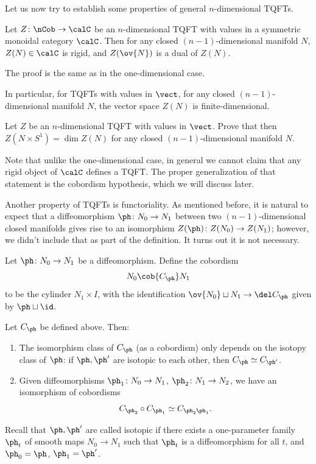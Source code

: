Let us now try to establish some properties of general $n$-dimensional TQFTs.

\begin{theorem}\label{t:tqft-rigidity}
  Let $Z\colon \nCob\to \calC$ be an $n$-dimensional TQFT with values in a
  symmetric monoidal category $\calC$. Then for any closed $(n-1)$-dimensional
  manifold $N$, $Z(N)\in \calC$ is rigid, and $Z(\ov{N})$ is a dual of $Z(N)$.
\end{theorem}
The proof is the same as in the one-dimensional case.

In particular, for TQFTs with values in $\vect$, for any closed
$(n-1)$-dimensional manifold $N$, the vector space $Z(N)$ is finite-dimensional.

\begin{exercise}\label{ec:tqft-duality}
  Let $Z$ be an $n$-dimensional TQFT with values in $\vect$. Prove that then
  $Z(N\times S^1)=\dim Z(N)$ for any closed $(n-1)$-dimensional manifold $N$.
\end{exercise}

Note that unlike the one-dimensional case, in general we cannot claim that any
rigid object of $\calC$ defines a TQFT. The proper generalization of that
statement is the cobordism hypothesis, which we will discuss later.



Another property of TQFTs is functoriality. As mentioned before, it is
natural to expect that a diffeomorphism $\ph \colon N_0\to N_1$ between two
$(n-1)$-dimensional closed manifolds gives rise to an isomorphism
$Z(\ph)\colon Z(N_0)\to Z(N_1)$; however, we didn't include that as part of
the definition. It turns out it is not necessary.

Let $\ph \colon N_0\to N_1$ be a diffeomorphism. Define the cobordism
\begin{equation}\label{e:Cph}
  N_0\cob{C_\ph} N_1
\end{equation}
to be the cylinder $N_1\times I$, with the identification $\ov{N_0}\sqcup N_1
\to \del C_\ph$ given by $\ph\sqcup \id$.

\begin{lemma}\label{l:tqft-isotopy}
  Let $C_\ph$ be defined above. Then:
  \begin{enumerate}
    \item The isomorphism class of $C_\ph$ \textup{(}as a cobordism\textup{)} only depends on the
    isotopy class of $\ph$: if $\ph, \ph'$ are isotopic to each other, then
      $C_\ph\simeq C_{\ph'}$.
    \item Given diffeomorphisms $\ph_1\colon N_0\to N_1$, $\ph_2\colon N_1\to
      N_2$, we have an isomorphism of cobordisms
      $$
        C_{\ph_2}\circ C_{\ph_1}\simeq C_{\ph_2 \ph_1}.
      $$
  \end{enumerate}
\end{lemma}
Recall that $\ph, \ph'$ are called isotopic if there exists a one-parameter
family $\ph_t$ of smooth maps $N_0\to N_1$ such that $\ph_t$ is a diffeomorphism
for all $t$, and $\ph_0=\ph$, $\ph_1=\ph'$.

